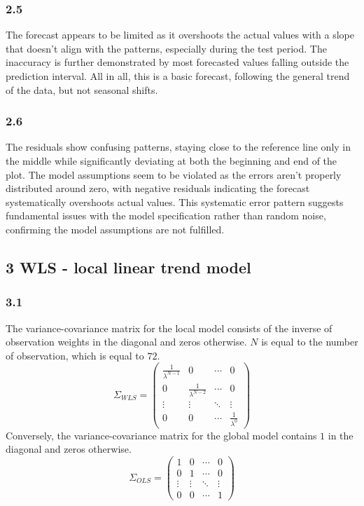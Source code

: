 \documentclass[
]{article}
\begin{document}
\subsubsection{2.5}\label{section-6}

The forecast appears to be limited as it overshoots the actual values
with a slope that doesn't align with the patterns, especially during the
test period. The inaccuracy is further demonstrated by most forecasted
values falling outside the prediction interval. All in all, this is a
basic forecast, following the general trend of the data, but not
seasonal shifts.

\subsubsection{2.6}\label{section-7}

The residuals show confusing patterns, staying close to the reference
line only in the middle while significantly deviating at both the
beginning and end of the plot. The model assumptions seem to be violated
as the errors aren't properly distributed around zero, with negative
residuals indicating the forecast systematically overshoots actual
values. This systematic error pattern suggests fundamental issues with
the model specification rather than random noise, confirming the model
assumptions are not fulfilled.

\subsection{3 WLS - local linear trend
model}\label{wls---local-linear-trend-model}

\subsubsection{3.1}\label{section-8}

The variance-covariance matrix for the local model consists of the
inverse of observation weights in the diagonal and zeros otherwise.
\(N\) is equal to the number of observation, which is equal to \(72\).
\[
\Sigma_{WLS} = 
\begin{pmatrix}
\frac{1}{\lambda^{N-1}} & 0 & \cdots & 0 \\
0 & \frac{1}{\lambda^{N-2}} & \cdots & 0 \\
\vdots & \vdots & \ddots & \vdots \\
0 & 0 & \cdots & \frac{1}{\lambda^{0}}
\end{pmatrix}
\] Conversely, the variance-covariance matrix for the global model
contains \(1\) in the diagonal and zeros otherwise. \[
\Sigma_{OLS}= 
\begin{pmatrix}
1 & 0 & \cdots & 0 \\
0 & 1 & \cdots & 0 \\
\vdots & \vdots & \ddots & \vdots \\
0 & 0 & \cdots & 1
\end{pmatrix}
\]
\end{document}
